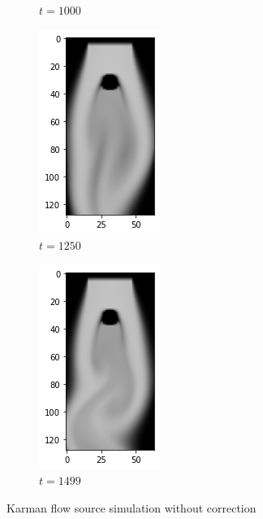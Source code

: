 \documentclass[a4paper,12pt,twoside]{report}
\begin{document}
\begin{figure}
\begin{subfigure}{0.18\textwidth}
		\caption{$t=1000$}
	\end{subfigure}
	\begin{subfigure}{0.18\textwidth}
		\centering
		\includegraphics[scale=0.5]{karmanflow/source_density_001250.png}
		\caption{$t=1250$}
	\end{subfigure}
	\begin{subfigure}{0.18\textwidth}
		\centering
		\includegraphics[scale=0.5]{karmanflow/source_density_001499.png}
		\caption{$t=1499$}
	\end{subfigure}
	\caption{Karman flow source simulation without correction}
	\label{sol karman high source}
\end{figure}
\end{document}
